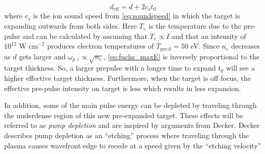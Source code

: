 \begin{equation}
	d_\text{eff} = d + 2 c_s t_0 \label{eq:d_eff}
\end{equation}
where $c_s$ is the ion sound speed from \cref{eq:soundspeed} in which the target is expanding outwards from both sides. Here $T_e$ is the temperature due to the pre-pulse and can be calculated by assuming that $T_e \propto I$ and that an intensity of $10^{12} \text{ W cm}^{-2}$ produces electron temperatures of $T_\text{pre,0} = 50$ eV. Since $n_e$ decreases as $d$ gets larger and $\omega_{p,i} \propto \sqrt{n_e}$, \cref{eq:fuchs_maxE} is inversely proportional to the target thickness. So, a larger prepulse with a longer time to expand $t_0$ will see a higher effective target thickness. Furthermore, when the target is off focus, the effective pre-pulse intensity on target is less which results in less expansion.

In addition, some of the main pulse energy can be depleted by traveling through the underdense region of this new pre-expanded target. These effects will be referred to as \emph{pump depletion} and are inspired by arguments from Decker\cite{Decker_1996_PoP}. Decker describes pump depletion as an ``etching'' process where traveling through the plasma causes wavefront edge to recede at a speed given by the ``etching velocity'' 

